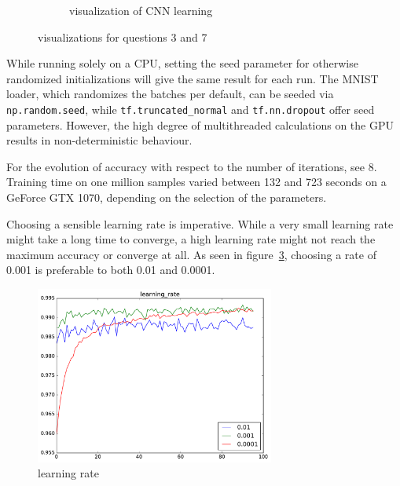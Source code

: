 \documentclass{article}
\def\code#1{\texttt{#1}}
\begin{document}
\begin{enumerate}
\begin{item}
\begin{figure}
\begin{subfigure}[b]{0.45\textwidth}
				\vspace{-24pt}
				\caption{visualization of CNN learning}
				\label{fig:vis_cnn}
			\end{subfigure}	
			\caption{visualizations for questions 3 and 7}
		\end{figure}
	\end{item}
\pagebreak
	\begin{item}
		While running solely on a CPU, setting the seed parameter for otherwise randomized initializations will give the same result for each run. The MNIST loader, which randomizes the batches per default, can be seeded via \code{np.random.seed}, while \code{tf.truncated\_normal} and \code{tf.nn.dropout} offer seed parameters. However, the high degree of multithreaded calculations on the GPU results in non-deterministic behaviour. 
	\end{item}
	\begin{item}
	For the evolution of accuracy with respect to the number of iterations, see 8. Training time on one million samples varied between 132 and 723 seconds on a GeForce GTX 1070, depending on the selection of the parameters.
	\end{item}

	\begin{item}
		Choosing a sensible learning rate is imperative. While a very small learning rate might take a long time to converge, a high learning rate might not reach the maximum accuracy or converge at all. As seen in figure~\ref{fig:learning_rate}, choosing a rate of 0.001 is preferable to both 0.01 and 0.0001.
			\begin{figure}
				\centering	
				\includegraphics[width=0.7\textwidth]{figures/learning_rate}
				\caption{learning rate}
				\label{fig:learning_rate}
			\end{figure}


\end{item}
\end{enumerate}
\end{document}
